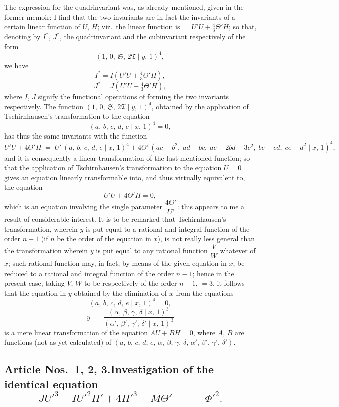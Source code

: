 \documentclass[11pt]{article}
\begin{document}
The expression for the quadrinvariant was, as already mentioned, given in the former memoir: I find that the two invariants are in fact the invariants of a certain linear function of $U$, $H$; viz.\ the linear function is $=U'U + \tfrac{4}{3}\Theta' H$; so that, denoting by $I^{*}$, $J^{*}$, the quadrinvariant and the cubinvariant respectively of the form
\[
(1,\,0,\,\mathfrak{S},\,2\mathfrak{T} \mid y,\,1)^{4},
\]
we have
\[
I^{*} = I(U'U + \tfrac{4}{3}\Theta' H),
\]
\[
J^{*} = J(U'U + \tfrac{4}{3}\Theta' H),
\]
where $I$, $J$ signify the functional operations of forming the two invariants respectively. The function $(1,\,0,\,\mathfrak{S},\,2\mathfrak{T} \mid y,\,1)^{4}$, obtained by the application of Tschirnhausen's transformation to the equation
\[
(a,\,b,\,c,\,d,\,e \mid x,\,1)^{4} = 0,
\]
has thus the same invariants with the function
\[
U' U + 4\Theta' H \;=\; U'\,(a,\,b,\,c,\,d,\,e \mid x,\,1)^{4} + 4\Theta'\,(ac-b^{2},\;ad-bc,\;ae+2bd-3c^{2},\;be-cd,\;ce-d^{2} \mid x,\,1)^{4},
\]
and it is consequently a linear transformation of the last-mentioned function; so that the application of Tschirnhausen's transformation to the equation $U = 0$ gives an equation linearly transformable into, and thus virtually equivalent to, the equation
\[
U' U + 4\Theta' H = 0,
\]
which is an equation involving the single parameter $\dfrac{4\Theta'}{U'}$: this appears to me a result of considerable interest. It is to be remarked that Tschirnhausen's transformation, wherein $y$ is put equal to a rational and integral function of the order $n-1$ (if $n$ be the order of the equation in $x$), is not really less general than the transformation wherein $y$ is put equal to any rational function $\dfrac{V}{W}$ whatever of $x$; such rational function may, in fact, by means of the given equation in $x$, be reduced to a rational and integral function of the order $n-1$; hence in the present case, taking $V$, $W$ to be respectively of the order $n-1$, $=3$, it follows that the equation in $y$ obtained by the elimination of $x$ from the equations
\[
(a,\,b,\,c,\,d,\,e \mid x,\,1)^{4} = 0,
\]
\[
y \;=\; \frac{(\alpha,\,\beta,\,\gamma,\,\delta \mid x,\,1)^{3}}{(\alpha',\,\beta',\,\gamma',\,\delta' \mid x,\,1)^{3}}
\]
is a mere linear transformation of the equation $AU + BH = 0$, where $A$, $B$ are functions (not as yet calculated) of $(a,\,b,\,c,\,d,\,e,\,\alpha,\,\beta,\,\gamma,\,\delta,\,\alpha',\,\beta',\,\gamma',\,\delta')$.

\subsection*{Article Nos.~1, 2, 3.\quad Investigation of the identical equation
\[
JU'^{3} - IU'^{2}H' + 4H'^{3} + M\Theta' \;=\; -\Phi'^{2}.
\]}
\end{document}
